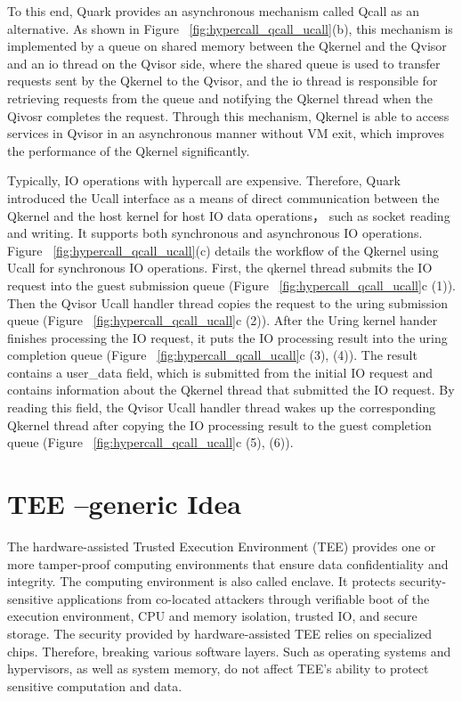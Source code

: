 To this end, Quark provides an asynchronous mechanism called Qcall as an alternative. 
As shown in Figure ~\ref{fig:hypercall_qcall_ucall}(b), this mechanism is implemented by a queue on shared memory between the Qkernel and the Qvisor and an io thread on the Qvisor side, where the
shared queue is used to transfer requests sent by the Qkernel to the Qvisor, and the io thread is responsible for retrieving requests from the queue and notifying the Qkernel thread when the Qivosr completes 
the request. Through this mechanism, Qkernel is able to access services in Qvisor in an asynchronous manner without VM exit, which improves the performance of the Qkernel significantly.

Typically, IO operations with hypercall are expensive. Therefore, Quark introduced the Ucall interface as a means of direct communication between the Qkernel and the host kernel for host 
IO data operations，  such as socket reading and writing. It supports both synchronous and asynchronous IO operations. Figure ~\ref{fig:hypercall_qcall_ucall}(c) details the workflow of the Qkernel 
using Ucall for synchronous IO operations. First, the qkernel thread submits the IO request into the guest submission queue (Figure ~\ref{fig:hypercall_qcall_ucall}c (1)). Then the Qvisor Ucall handler thread copies the request to the uring submission 
queue (Figure ~\ref{fig:hypercall_qcall_ucall}c (2)). After the Uring kernel hander finishes processing the IO request, it puts the IO processing result into the uring completion queue (Figure ~\ref{fig:hypercall_qcall_ucall}c (3), (4)). The result 
contains a user\_data field, which is submitted from the initial IO request and contains information about the Qkernel thread that submitted the IO request. By reading this field, the Qvisor Ucall handler thread wakes up the corresponding Qkernel thread 
after copying the IO processing result to the guest completion queue (Figure ~\ref{fig:hypercall_qcall_ucall}c (5), (6)).



\section{TEE --generic Idea}
The hardware-assisted Trusted Execution Environment (TEE) provides one or more tamper-proof computing environments that ensure data confidentiality and integrity. The computing environment is also called enclave. It protects security-sensitive applications from co-located attackers 
through verifiable boot of the execution environment, CPU and memory isolation, trusted IO, and secure storage\cite*{Hardware-supported-TEE}. The security provided by hardware-assisted TEE relies on specialized chips. Therefore, breaking various software layers.
Such as operating systems and hypervisors, as well as system memory, do not affect TEE's ability to protect sensitive computation and data\cite*{7345265}.

